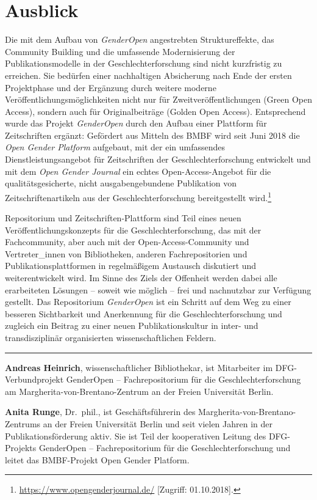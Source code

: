 \documentclass[a4paper,
fontsize=11pt,
oneside,
numbers=noperiodatend,
parskip=half-,
bibliography=totoc,
final
]{scrartcl}
\begin{document}
\hypertarget{ausblick}{%
\section{Ausblick}\label{ausblick}}

Die mit dem Aufbau von \emph{GenderOpen} angestrebten Struktureffekte,
das Community Building und die umfassende Modernisierung der
Publikationsmodelle in der Geschlechterforschung sind nicht kurzfristig
zu erreichen. Sie bedürfen einer nachhaltigen Absicherung nach Ende der
ersten Projektphase und der Ergänzung durch weitere moderne
Veröffentlichungsmöglichkeiten nicht nur für Zweitveröffentlichungen
(Green Open Access), sondern auch für Originalbeiträge (Golden Open
Access). Entsprechend wurde das Projekt \emph{GenderOpen} durch den
Aufbau einer Plattform für Zeitschriften ergänzt: Gefördert aus Mitteln
des BMBF wird seit Juni 2018 die \emph{Open Gender Platform} aufgebaut,
mit der ein umfassendes Dienstleistungsangebot für Zeitschriften der
Geschlechterforschung entwickelt und mit dem \emph{Open Gender Journal}
ein echtes Open-Access-Angebot für die qualitätsgesicherte, nicht
ausgabengebundene Publikation von Zeitschriftenartikeln aus der
Geschlechterforschung bereitgestellt wird.\footnote{\url{https://www.opengenderjournal.de/}
  {[}Zugriff: 01.10.2018{]}.}

Repositorium und Zeitschriften-Plattform sind Teil eines neuen
Veröffentlichungskonzepts für die Geschlechterforschung, das mit der
Fachcommunity, aber auch mit der Open-Access-Comm\-unity und
Vertreter\_innen von Bibliotheken, anderen Fachrepositorien und
Publikationsplattformen in regelmäßigem Austausch diskutiert und
weiterentwickelt wird. Im Sinne des Ziels der Offenheit werden dabei
alle erarbeiteten Lösungen -- soweit wie möglich -- frei und nachnutzbar
zur Verfügung gestellt. Das Repositorium \emph{GenderOpen} ist ein
Schritt auf dem Weg zu einer besseren Sichtbarkeit und Anerkennung für
die Geschlechterforschung und zugleich ein Beitrag zu einer neuen
Publikationskultur in inter- und transdisziplinär organisierten
wissenschaftlichen Feldern.

\begin{center}\rule{0.5\linewidth}{\linethickness}\end{center}

\textbf{Andreas Heinrich}, wissenschaftlicher Bibliothekar, ist
Mitarbeiter im DFG-Verbundprojekt GenderOpen -- Fachrepositorium für die
Geschlechterforschung am Margherita-von-Brentano-Zen\-trum an der Freien
Universität Berlin.

\textbf{Anita Runge}, Dr.~phil., ist Geschäftsführerin des
Margherita-von-Brentano-Zentrums an der Freien Universität Berlin und
seit vielen Jahren in der Publikationsförderung aktiv. Sie ist Teil der
kooperativen Leitung des DFG-Projekts GenderOpen -- Fachrepositorium
für die Geschlechterforschung und leitet das BMBF-Projekt Open Gender
Platform.
\end{document}

